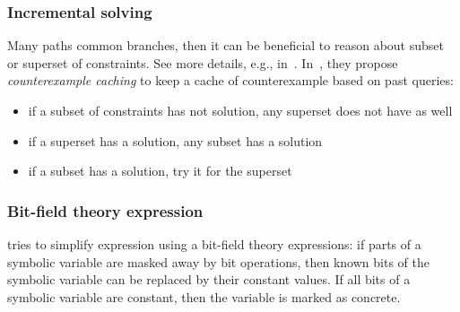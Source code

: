 \subsubsection{Incremental solving} Many paths common branches, then it can be beneficial to reason about subset or superset of constraints. See more details, e.g., in~\cite{KLEE-OSDI08,CUTE-FSE05}. In~\cite{KLEE-OSDI08}, they propose {\em counterexample caching} to keep a cache of counterexample based on past queries:
      \begin{itemize}
        \item if a subset of constraints has not solution, any superset does not have as well
        \item if a superset has a solution, any subset has a solution
        \item if a subset has a solution, try it for the superset
      \end{itemize}

\subsubsection{Bit-field theory expression} \cite{CKC-TOCS12} tries to simplify expression using a bit-field theory expressions: if parts of a symbolic variable are masked away by bit operations, then known bits of the symbolic variable can be replaced by their constant values. If all bits of a symbolic variable are constant, then the variable is marked as concrete.

\fi


